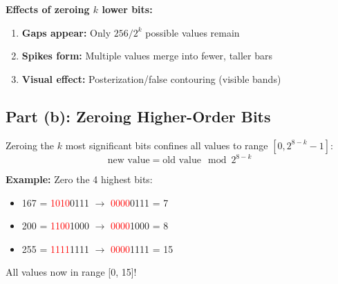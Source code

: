\documentclass[12pt,a4paper]{article}
\begin{document}
\begin{keypoint}
\textbf{Effects of zeroing $k$ lower bits:}
\begin{enumerate}
    \item \textbf{Gaps appear:} Only $256/2^k$ possible values remain
    \item \textbf{Spikes form:} Multiple values merge into fewer, taller bars
    \item \textbf{Visual effect:} Posterization/false contouring (visible bands)
\end{enumerate}
\end{keypoint}

\subsection{Part (b): Zeroing Higher-Order Bits}

\begin{conceptbox}
Zeroing the $k$ most significant bits confines all values to range $[0, 2^{8-k}-1]$:
\[
\text{new value} = \text{old value} \mod 2^{8-k}
\]
\end{conceptbox}

\textbf{Example:} Zero the 4 highest bits:
\begin{itemize}
    \item 167 = \textcolor{red}{1010}0111 $\rightarrow$ \textcolor{red}{0000}0111 = 7
    \item 200 = \textcolor{red}{1100}1000 $\rightarrow$ \textcolor{red}{0000}1000 = 8
    \item 255 = \textcolor{red}{1111}1111 $\rightarrow$ \textcolor{red}{0000}1111 = 15
\end{itemize}

All values now in range [0, 15]!
\end{document}

